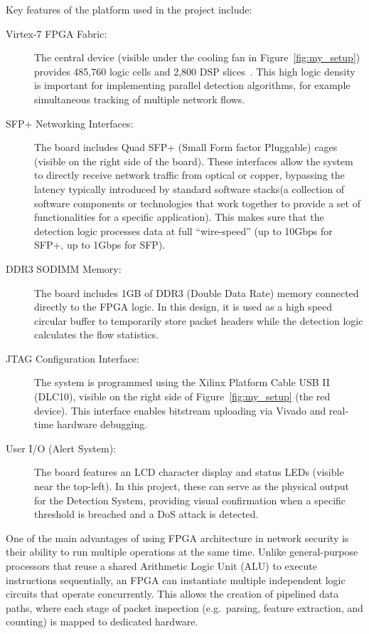 Key features of the platform used in the project include:

\begin{description}
      \item[Virtex-7 FPGA Fabric:] The central device (visible under the cooling fan in Figure~\ref{fig:my_setup}) provides 485,760 logic cells and 2,800 DSP slices~\cite{noauthor_7_2020}. This high logic density is important for implementing parallel detection algorithms, for example simultaneous tracking of multiple network flows.

      \item[SFP+ Networking Interfaces:] The board includes Quad SFP+ (Small Form factor Pluggable) cages (visible on the right side of the board). These interfaces allow the system to directly receive network traffic from optical or copper, bypassing the latency typically introduced by standard software stacks(a collection of software components or technologies that work together to provide a set of functionalities for a specific application). This makes sure that the detection logic processes data at full ``wire-speed'' (up to 10Gbps for SFP+, up to 1Gbps for SFP).

      \item[DDR3 SODIMM Memory:] The board includes 1GB of DDR3 (Double Data Rate) memory connected directly to the FPGA logic. In this design, it is used as a high speed circular buffer to temporarily store packet headers while the detection logic calculates the flow statistics.

      \item[JTAG Configuration Interface:] The system is programmed using the Xilinx Platform Cable USB II (DLC10), visible on the right side of Figure~\ref{fig:my_setup} (the red device). This interface enables bitstream uploading via Vivado and real-time hardware debugging.

      \item[User I/O (Alert System):] The board features an LCD character display and status LEDs (visible near the top-left). In this project, these can serve as the physical output for the Detection System, providing visual confirmation when a specific threshold is breached and a DoS attack is detected.
\end{description}

One of the main advantages of using FPGA architecture in network security is
their ability to run multiple operations at the same time. Unlike general-purpose processors that reuse a shared Arithmetic Logic Unit (ALU) to execute instructions sequentially, an FPGA can
instantiate multiple independent logic circuits that operate concurrently.
This allows the creation of pipelined data paths, where each stage of
packet inspection (e.g.\ parsing, feature extraction, and counting) is mapped
to dedicated hardware.

